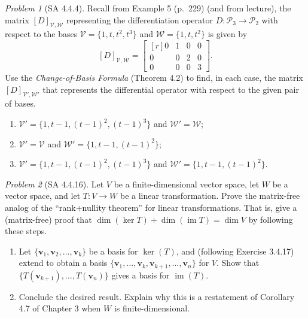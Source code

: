 \documentclass[fleqn,11pt]{paper}
\theoremstyle{remark}
\newtheorem{problem}{Problem}
\newtheorem*{solution}{{\bf Solution}}
\renewcommand{\ker}{\ensuremath{\operatorname{ker}}}
\renewcommand{\dim}{\ensuremath{\operatorname{dim}}}
\newcommand\im{\ensuremath{\operatorname{im}}}
\renewcommand{\vec}[1]{\mathbf{#1}}
\newcommand{\<}{\ensuremath{\langle}}
\renewcommand{\>}{\ensuremath{\rangle}}
\newcommand\vv{\vec{v}}
\newcommand\sV{\ensuremath{\mathcal V}}
\newcommand\sW{\ensuremath{\mathcal W}}
\begin{document}
\begin{problem}[SA 4.4.4]
Recall from  Example 5 (p.~229) (and from lecture), 
the matrix $[D]_{\sV, \sW}$ representing the differentiation operator 
$D : \mathcal{P}_3 \to \mathcal{P}_2$ with respect to the bases
$\sV = \{1, t, t^2 , t^3 \}$ and $\sW = \{1, t, t^2\}$ is given by
\[
[D]_{\sV, \sW} = \begin{bmatrix*}[r] 
0 & 1 & 0 & 0 \\ 
0 & 0 & 2 & 0 \\
0 & 0 & 0 & 3
\end{bmatrix*}.
\]
Use the \emph{Change-of-Basis Formula} (Theorem 4.2) to find, 
in each case, the matrix $[D]_{\sV', \sW'}$ that represents the differential operator
with respect to the given pair of bases.
\begin{enumerate}[{\bf a.}]
\item 
$\sV' = \{1, t - 1, (t - 1)^2 , (t - 1)^3 \}$ and  $\sW' = \sW$;
\item 
$\sV' = \sV$ and $\sW' = \{1, t - 1, (t - 1)^2 \}$;
\item
$\sV' = \{1, t - 1, (t - 1)^2 , (t - 1)^3 \}$ and $\sW' = \{1, t - 1, (t - 1)^2 \}$.
\end{enumerate}
\end{problem}

\newpage

\begin{problem}[SA 4.4.16]
  \label{prob2}
Let $V$ be a finite-dimensional vector space, let $W$ be a vector space, and let 
$T : V \to W$ be a linear transformation. 
Prove the matrix-free analog of the ``rank+nullity theorem'' for linear transformations.
That is, give a (matrix-free) proof that $\dim(\ker T) + \dim(\im T) = \dim V$
by following these steps.
\begin{enumerate}[{\bf a.}]
\item 
Let $\{\vv_1, \vv_2, \dots, \vv_k\}$ 
be a basis for $\ker(T)$, and (following Exercise 3.4.17) 
extend to obtain a basis $\{\vv_1, \dots, \vv_k, \vv_{k+1},\dots, \vv_n\}$ 
for $V$. Show that $\{T(\vv_{k+1}), \dots, T(\vv_n)\}$
gives a basis for $\im(T)$.
\item Conclude the desired result. Explain why this is a restatement of
  Corollary 4.7 of Chapter 3 when $W$ is finite-dimensional.
\end{enumerate}
\end{problem}
\medskip
\end{document}
